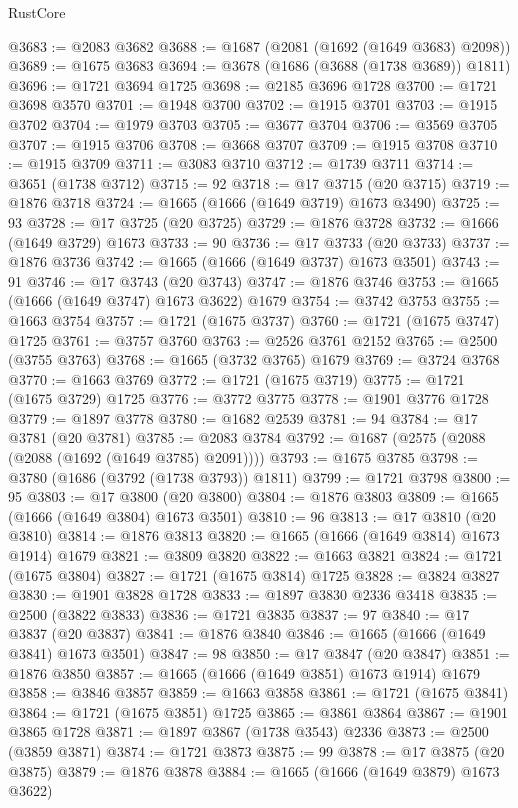\begin{lexlean}{RustCore}
\begin{coremodule}
@3683 := @2083 @3682
@3688 := @1687 (@2081 (@1692 (@1649 @3683) @2098))
@3689 := @1675 @3683
@3694 := @3678 (@1686 (@3688 (@1738 @3689)) @1811)
@3696 := @1721 @3694 @1725
@3698 := @2185 @3696 @1728
@3700 := @1721 @3698 @3570
@3701 := @1948 @3700
@3702 := @1915 @3701
@3703 := @1915 @3702
@3704 := @1979 @3703
@3705 := @3677 @3704
@3706 := @3569 @3705
@3707 := @1915 @3706
@3708 := @3668 @3707
@3709 := @1915 @3708
@3710 := @1915 @3709
@3711 := @3083 @3710
@3712 := @1739 @3711
@3714 := @3651 (@1738 @3712)
@3715 := 92
@3718 := @17 @3715 (@20 @3715)
@3719 := @1876 @3718
@3724 := @1665 (@1666 (@1649 @3719) @1673 @3490)
@3725 := 93
@3728 := @17 @3725 (@20 @3725)
@3729 := @1876 @3728
@3732 := @1666 (@1649 @3729) @1673
@3733 := 90
@3736 := @17 @3733 (@20 @3733)
@3737 := @1876 @3736
@3742 := @1665 (@1666 (@1649 @3737) @1673 @3501)
@3743 := 91
@3746 := @17 @3743 (@20 @3743)
@3747 := @1876 @3746
@3753 := @1665 (@1666 (@1649 @3747) @1673 @3622) @1679
@3754 := @3742 @3753
@3755 := @1663 @3754
@3757 := @1721 (@1675 @3737)
@3760 := @1721 (@1675 @3747) @1725
@3761 := @3757 @3760
@3763 := @2526 @3761 @2152
@3765 := @2500 (@3755 @3763)
@3768 := @1665 (@3732 @3765) @1679
@3769 := @3724 @3768
@3770 := @1663 @3769
@3772 := @1721 (@1675 @3719)
@3775 := @1721 (@1675 @3729) @1725
@3776 := @3772 @3775
@3778 := @1901 @3776 @1728
@3779 := @1897 @3778
@3780 := @1682 @2539
@3781 := 94
@3784 := @17 @3781 (@20 @3781)
@3785 := @2083 @3784
@3792 := @1687 (@2575 (@2088 (@2088 (@1692 (@1649 @3785) @2091))))
@3793 := @1675 @3785
@3798 := @3780 (@1686 (@3792 (@1738 @3793)) @1811)
@3799 := @1721 @3798
@3800 := 95
@3803 := @17 @3800 (@20 @3800)
@3804 := @1876 @3803
@3809 := @1665 (@1666 (@1649 @3804) @1673 @3501)
@3810 := 96
@3813 := @17 @3810 (@20 @3810)
@3814 := @1876 @3813
@3820 := @1665 (@1666 (@1649 @3814) @1673 @1914) @1679
@3821 := @3809 @3820
@3822 := @1663 @3821
@3824 := @1721 (@1675 @3804)
@3827 := @1721 (@1675 @3814) @1725
@3828 := @3824 @3827
@3830 := @1901 @3828 @1728
@3833 := @1897 @3830 @2336 @3418
@3835 := @2500 (@3822 @3833)
@3836 := @1721 @3835
@3837 := 97
@3840 := @17 @3837 (@20 @3837)
@3841 := @1876 @3840
@3846 := @1665 (@1666 (@1649 @3841) @1673 @3501)
@3847 := 98
@3850 := @17 @3847 (@20 @3847)
@3851 := @1876 @3850
@3857 := @1665 (@1666 (@1649 @3851) @1673 @1914) @1679
@3858 := @3846 @3857
@3859 := @1663 @3858
@3861 := @1721 (@1675 @3841)
@3864 := @1721 (@1675 @3851) @1725
@3865 := @3861 @3864
@3867 := @1901 @3865 @1728
@3871 := @1897 @3867 (@1738 @3543) @2336
@3873 := @2500 (@3859 @3871)
@3874 := @1721 @3873
@3875 := 99
@3878 := @17 @3875 (@20 @3875)
@3879 := @1876 @3878
@3884 := @1665 (@1666 (@1649 @3879) @1673 @3622)

\end{coremodule}
\end{lexlean}
